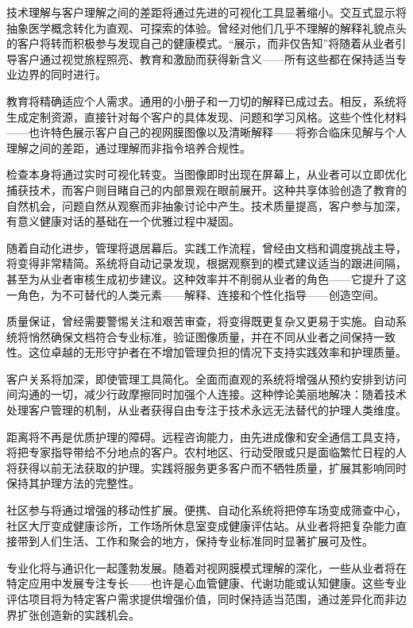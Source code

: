 \documentclass[
  Letterpaper,
]{scrbook}
\begin{document}
技术理解与客户理解之间的差距将通过先进的可视化工具显著缩小。交互式显示将抽象医学概念转化为直观、可探索的体验。曾经对他们几乎不理解的解释礼貌点头的客户将转而积极参与发现自己的健康模式。``展示，而非仅告知''将随着从业者引导客户通过视觉旅程照亮、教育和激励而获得新含义------所有这些都在保持适当专业边界的同时进行。

教育将精确适应个人需求。通用的小册子和一刀切的解释已成过去。相反，系统将生成定制资源，直接针对每个客户的具体发现、问题和学习风格。这些个性化材料------也许特色展示客户自己的视网膜图像以及清晰解释------将弥合临床见解与个人理解之间的差距，通过理解而非指令培养合规性。

检查本身将通过实时可视化转变。当图像即时出现在屏幕上，从业者可以立即优化捕获技术，而客户则目睹自己的内部景观在眼前展开。这种共享体验创造了教育的自然机会，问题自然从观察而非抽象讨论中产生。技术质量提高，客户参与加深，有意义健康对话的基础在一个优雅过程中凝固。

随着自动化进步，管理将退居幕后。实践工作流程，曾经由文档和调度挑战主导，将变得非常精简。系统将自动记录发现，根据观察到的模式建议适当的跟进间隔，甚至为从业者审核生成初步建议。这种效率并不削弱从业者的角色------它提升了这一角色，为不可替代的人类元素------解释、连接和个性化指导------创造空间。

质量保证，曾经需要警惕关注和艰苦审查，将变得既更复杂又更易于实施。自动系统将悄然确保文档符合专业标准，验证图像质量，并在不同从业者之间保持一致性。这位卓越的无形守护者在不增加管理负担的情况下支持实践效率和护理质量。

客户关系将加深，即使管理工具简化。全面而直观的系统将增强从预约安排到访问间沟通的一切，减少行政摩擦同时加强个人连接。这种悖论美丽地解决：随着技术处理客户管理的机制，从业者获得自由专注于技术永远无法替代的护理人类维度。

距离将不再是优质护理的障碍。远程咨询能力，由先进成像和安全通信工具支持，将把专家指导带给不分地点的客户。农村地区、行动受限或只是面临繁忙日程的人将获得以前无法获取的护理。实践将服务更多客户而不牺牲质量，扩展其影响同时保持其护理方法的完整性。

社区参与将通过增强的移动性扩展。便携、自动化系统将把停车场变成筛查中心，社区大厅变成健康诊所，工作场所休息室变成健康评估站。从业者将把复杂能力直接带到人们生活、工作和聚会的地方，保持专业标准同时显著扩展可及性。

专业化将与通识化一起蓬勃发展。随着对视网膜模式理解的深化，一些从业者将在特定应用中发展专注专长------也许是心血管健康、代谢功能或认知健康。这些专业评估项目将为特定客户需求提供增强价值，同时保持适当范围，通过差异化而非边界扩张创造新的实践机会。
\end{document}
